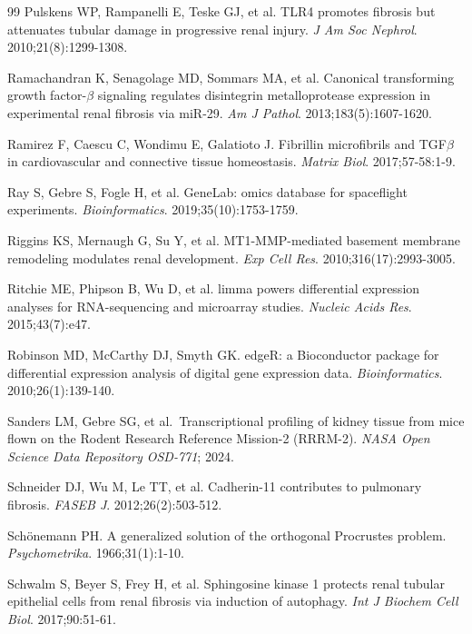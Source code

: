 \documentclass[11pt]{article}
\begin{document}
\begin{thebibliography}{99}
 Pulskens WP, Rampanelli E, Teske GJ, et al. TLR4 promotes fibrosis but attenuates tubular damage in progressive renal injury. \emph{J Am Soc Nephrol}. 2010;21(8):1299-1308.

 Ramachandran K, Senagolage MD, Sommars MA, et al. Canonical transforming growth factor-$\beta$ signaling regulates disintegrin metalloprotease expression in experimental renal fibrosis via miR-29. \emph{Am J Pathol}. 2013;183(5):1607-1620.

 Ramirez F, Caescu C, Wondimu E, Galatioto J. Fibrillin microfibrils and TGF$\beta$ in cardiovascular and connective tissue homeostasis. \emph{Matrix Biol}. 2017;57-58:1-9.

 Ray S, Gebre S, Fogle H, et al. GeneLab: omics database for spaceflight experiments. \emph{Bioinformatics}. 2019;35(10):1753-1759.

 Riggins KS, Mernaugh G, Su Y, et al. MT1-MMP-mediated basement membrane remodeling modulates renal development. \emph{Exp Cell Res}. 2010;316(17):2993-3005.

 Ritchie ME, Phipson B, Wu D, et al. limma powers differential expression analyses for RNA-sequencing and microarray studies. \emph{Nucleic Acids Res}. 2015;43(7):e47.

 Robinson MD, McCarthy DJ, Smyth GK. edgeR: a Bioconductor package for differential expression analysis of digital gene expression data. \emph{Bioinformatics}. 2010;26(1):139-140.

 Sanders LM, Gebre SG, et al.\ Transcriptional profiling of kidney tissue from mice flown on the Rodent Research Reference Mission-2 (RRRM-2). \emph{NASA Open Science Data Repository OSD-771}; 2024.

 Schneider DJ, Wu M, Le TT, et al. Cadherin-11 contributes to pulmonary fibrosis. \emph{FASEB J}. 2012;26(2):503-512.

 Sch\"onemann PH. A generalized solution of the orthogonal Procrustes problem. \emph{Psychometrika}. 1966;31(1):1-10.

 Schwalm S, Beyer S, Frey H, et al. Sphingosine kinase 1 protects renal tubular epithelial cells from renal fibrosis via induction of autophagy. \emph{Int J Biochem Cell Biol}. 2017;90:51-61.


\end{thebibliography}
\end{document}
